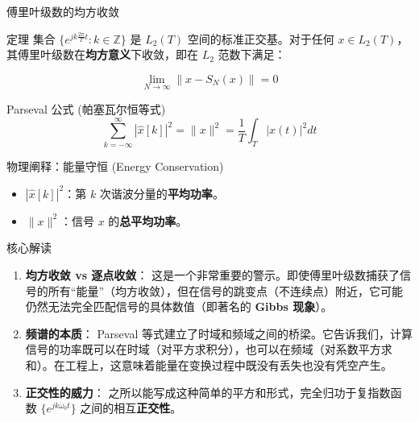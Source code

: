 \documentclass[
  ignorenonframetext,
]{beamer}
\providecommand{\tightlist}{%
  \setlength{\itemsep}{0pt}\setlength{\parskip}{0pt}}
\begin{document}
\begin{frame}{傅里叶级数的均方收敛}
\protect{}\label{ux5085ux91ccux53f6ux7ea7ux6570ux7684ux5747ux65b9ux6536ux655b}
\begin{block}{定理}
\protect{}\label{ux5b9aux7406}
集合 \(\{e^{j k \frac{2\pi}{T} t} : k \in \mathbb{Z}\}\) 是 \(L_2(T)\)
空间的标准正交基。对于任何
\(x \in L_2(T)\)，其傅里叶级数在\textbf{均方意义}下收敛，即在 \(L_2\)
范数下满足：

\[\lim_{N \to \infty} \|x - S_N(x)\| = 0\]
\end{block}

\begin{block}{Parseval 公式 (帕塞瓦尔恒等式)}
\protect{}\label{parseval-ux516cux5f0f-ux5e15ux585eux74e6ux5c14ux6052ux7b49ux5f0f}
\[\sum_{k=-\infty}^{\infty} |\hat{x}[k]|^2 = \|x\|^2 = \frac{1}{T} \int_{T} |x(t)|^2 dt\]
\end{block}

\begin{block}{物理阐释：能量守恒 (Energy Conservation)}
\protect{}\label{ux7269ux7406ux9610ux91caux80fdux91cfux5b88ux6052-energy-conservation}
\begin{itemize}
\tightlist
\item
  \textbf{\(|\hat{x}[k]|^2\)}：第 \(k\) 次谐波分量的\textbf{平均功率}。
\item
  \textbf{\(\|x\|^2\)}：信号 \(x\) 的\textbf{总平均功率}。
\end{itemize}
\end{block}

\begin{block}{核心解读}
\protect{}\label{ux6838ux5fc3ux89e3ux8bfb}
\begin{enumerate}
\item
  \textbf{均方收敛 vs 逐点收敛}：
  这是一个非常重要的警示。即使傅里叶级数捕获了信号的所有``能量''（均方收敛），但在信号的跳变点（不连续点）附近，它可能仍然无法完全匹配信号的具体数值（即著名的
  \textbf{Gibbs 现象}）。
\item
  \textbf{频谱的本质}： Parseval
  等式建立了时域和频域之间的桥梁。它告诉我们，计算信号的功率既可以在时域（对平方求积分），也可以在频域（对系数平方求和）。在工程上，这意味着能量在变换过程中既没有丢失也没有凭空产生。
\item
  \textbf{正交性的威力}：
  之所以能写成这种简单的平方和形式，完全归功于复指数函数
  \(\{e^{j k \omega_0 t}\}\) 之间的相互\textbf{正交性}。
\end{enumerate}
\end{block}
\end{frame}
\end{document}
